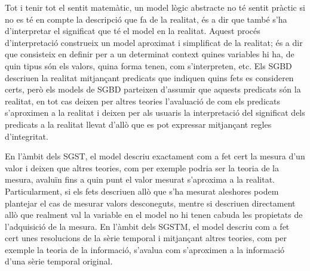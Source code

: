 Tot i tenir tot el sentit matemàtic, un model lògic abstracte no té
sentit pràctic si no es té en compte la descripció que fa de la
realitat, és a dir que també s'ha d'interpretar el significat que té
el model en la realitat.  Aquest procés d'interpretació construeix un
model aproximat i simplificat de la realitat; és a dir que consisteix
en definir per a un determinat context quines variables hi ha, de quin
tipus són els valors, quina forma tenen, com s'interpreten, etc.  Els
\gls{SGBD} descriuen la realitat mitjançant predicats que indiquen
quins fets es consideren certs, però els models de \gls{SGBD}
parteixen d'assumir que aquests predicats són la realitat, en tot cas
deixen per altres teories l'avaluació de com els predicats s'aproximen
a la realitat i deixen per als usuaris la interpretació del significat
dels predicats a la realitat llevat d'allò que es pot expressar
mitjançant regles d'integritat.


En l'àmbit dels \gls{SGST}, el model descriu
exactament com a fet cert la mesura d'un valor i deixen que altres
teories, com per exemple podria ser la teoria de la mesura, avaluïn
fins a quin punt el valor mesurat s'aproxima a la
realitat. Particularment, si els fets descriuen allò que s'ha mesurat
aleshores podem plantejar el cas de mesurar valors desconeguts, mentre
si descriuen directament allò que realment val la variable en el model
no hi tenen cabuda les propietats de l'adquisició de la mesura. 
En l'àmbit dels \gls{SGSTM}, el model descriu com a fet cert unes
resolucions de la sèrie temporal i mitjançant altres teories, com per
exemple la teoria de la informació, s'avalua com s'aproximen a la
informació d'una sèrie temporal original.






